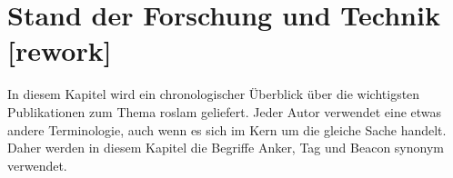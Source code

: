\begin{comment}
------------------------------------------------------------------------------------------
\end{comment}
\chapter{Stand der Forschung und Technik [rework]}

In diesem Kapitel wird ein chronologischer Überblick über die wichtigsten Publikationen zum Thema \Gls{roslam} geliefert. Jeder Autor verwendet eine etwas andere Terminologie, auch wenn es sich im Kern um die gleiche Sache handelt. Daher werden in diesem Kapitel die Begriffe Anker, Tag und Beacon synonym verwendet.


\begin{comment}
------------------------------------------------------------------------------------------
- \cite{kantor2002preliminary}
- Preliminary results in range-only localization and mapping (189)
- Section 2
	- Statische Lokalisierung
		- Vorherige Sensorinformationen und Positionsschätzung werden nicht genutzt.
		- Annahme: Position der Beacons ist bekannt und fix.
	- Markovian probability grids
	- Mit fehlerfreien Messungen ist die Positionsbestimmung trivial
	- Entfernungsmessung mit einem erwarteten Fehler von 6 feet, also 1,82 meter. (1Fuß==30cm)
	- 1. Characterizing Range Measurements
		- Erstellen einer Verteilungsfunktion für die Entfernungsmessung
		- experimentel bestimmt
		- Diskrete Messungen in einem Set {0,6,12,...,50}
	- 2. Creating Probability Grids
		- Für jede Zelle des Grid wird die Wahrscheinlichkeit mittels der PDF berechnet.
	- 3. Combine Probability Grids
		- Multiply in a pointwise manner
		- scale the result so that the sum over the squares is one.
		- Aus den kombinierten Ergebnisgrid kann die schätzte Position mittels der gewichteten Durchschnitt der Gridzellen berechnet werden.
		- Covariance Matrix lässt sich auch bestimmen
	- Durchschnittlich geschätzer Fehler lag ab 1,62 feet bei einem geschätzen Entfernungsmess Fehler von 5.82 bis 7.18 feet.
- Section 3
	- Beacon positionen sind bekannt
	- Vorherige Positionsschätzung und Odometry daten werden verwendet.
	- Positionsverfolgung mittels Kalman und Monte Carlo
	- Kalman
		- Initiale Positionsschätzung wie in Section 2, jedoch mit drei Beacons.
		- Approximieren eines ringförmigen Gauß-Verteilung um die geschätzte Position.
		- Füttern eines entsprechenden EKF mit den Parametern
	- Monte Carlo
		- Verwendet die pdf aus Section 2 um die Partikels zu gewichten.
	- Durchschnittliche Geschätzter Fehler
		- EKT: 0,73 feet
		- MC: 0,93 feet
- Section 4
	- Lokalisieren in einer Umgebung mit unsicheren beacon positionen
		- Approximately known, good but not perfect
		- crude measurement or estimate location on blueprint
	- SLAM mit EKF
		- State ist die Robot-- und Beacon--Position
		- Error: init 5.13 feet, end 0.77 feet
\end{comment}
